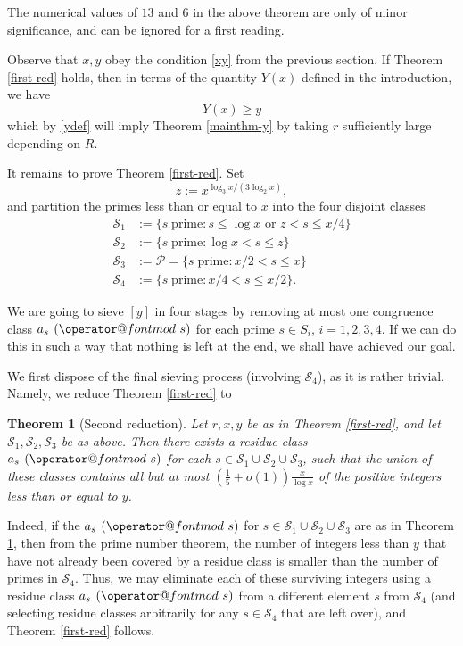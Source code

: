 \documentclass[11pt]{amsart}
\makeatletter
\numberwithin{equation}{section}  %
\theoremstyle{remark}
\theoremstyle{plain}
\newtheorem{thm}{Theorem}
\numberwithin{equation}{section}
\renewcommand{\pmod}[1]{\allowbreak\mkern7mu({\operator@font mod}\,\,#1)}
\renewcommand{\le}{\leqslant}
\renewcommand{\leq}{\leqslant}
\renewcommand{\geq}{\geqslant}
\renewcommand{\(}{\left(}
\renewcommand{\)}{\right)}
\newcommand{\PP}{\mathcal{P}}
\newcommand{\cS}{\mathcal{S}}
\makeatother
\begin{document}
The numerical values of $13$ and $6$ in the above theorem are only of minor significance, and can be ignored for a first reading.

Observe that $x,y$ obey the condition \eqref{xy} from the previous section.  If Theorem \ref{first-red} holds, then in  terms of the quantity $Y(x)$ defined in the introduction, we have
$$ Y(x) \geq y$$
which by \eqref{ydef} will imply Theorem \ref{mainthm-y} by taking $r$ sufficiently large depending on $R$.

It remains to prove Theorem \ref{first-red}.  Set
\begin{equation}\label{zdef}
 z :=x^{\log_3 x/(3\log_2 x)},
\end{equation}
and partition the primes less than or equal to $x$ into the four disjoint classes
\begin{align*}
\cS_1 &:= \{ s \; \mbox{prime} : s\le \log x \text{ or } z < s \le x/4 \}\\
\cS_2 &:= \{ s\; \mbox{prime} : \log x < s \le z \}\\
\cS_3 &:= \PP = \{ s \; \mbox{prime}: x/2 < s \leq x\}\\
\cS_4 &:= \{s \;\mbox{prime}: x/4 < s \leq x/2\}.
\end{align*}

We are going to sieve $[y]$ in four stages by removing at most one congruence class $a_s \pmod{s}$ for each prime $s \in S_i$, $i = 1,2,3,4$. If we can do this in such a way that nothing is left at the end, we shall have achieved our goal.

We first dispose of the final sieving process (involving $\cS_4$), as it is rather trivial.  Namely, we reduce Theorem \ref{first-red} to

\begin{thm}[Second reduction]\label{second-red}  Let $r,x,y$ be as in
  Theorem \ref{first-red}, and let $\cS_1,\cS_2,\cS_3$ be as above.
  Then there exists a residue class $a_s \pmod s$ for each $s \in
  \cS_1 \cup \cS_2 \cup \cS_3$, such that the union of these classes
  contains all but at most $(\frac{1}{5} + o(1)) \frac{x}{\log x}$ of the positive integers less than or equal to $y$.
\end{thm}

Indeed, if the $a_s \pmod s$ for $s \in \cS_1 \cup \cS_2 \cup \cS_3$ are as in Theorem \ref{second-red}, then from the prime number theorem, the number of integers less than $y$ that have not already been covered by a residue class is smaller than the number of primes in $\cS_4$.  Thus, we may eliminate each of these surviving integers using a residue class $a_s \pmod s$ from a different element $s$ from $\cS_4$ (and selecting residue classes arbitrarily for any $s \in \cS_4$ that are left over), and Theorem \ref{first-red} follows.
\end{document}
